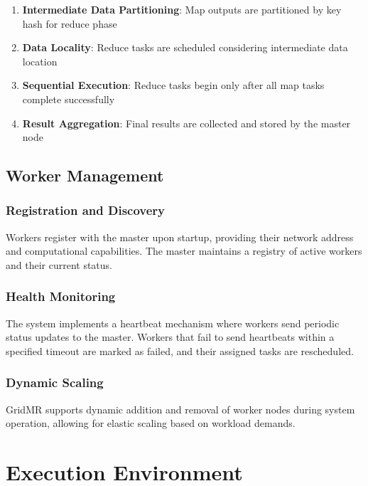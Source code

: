 \documentclass[11pt,letterpaper,oneside]{article}
\begin{document}
\begin{enumerate}
    \item \textbf{Intermediate Data Partitioning}: Map outputs are partitioned by key hash for reduce phase
    \item \textbf{Data Locality}: Reduce tasks are scheduled considering intermediate data location
    \item \textbf{Sequential Execution}: Reduce tasks begin only after all map tasks complete successfully
    \item \textbf{Result Aggregation}: Final results are collected and stored by the master node
\end{enumerate}

\subsection{Worker Management}

\subsubsection{Registration and Discovery}

Workers register with the master upon startup, providing their network address and computational capabilities. The master maintains a registry of active workers and their current status.

\subsubsection{Health Monitoring}

The system implements a heartbeat mechanism where workers send periodic status updates to the master. Workers that fail to send heartbeats within a specified timeout are marked as failed, and their assigned tasks are rescheduled.

\subsubsection{Dynamic Scaling}

GridMR supports dynamic addition and removal of worker nodes during system operation, allowing for elastic scaling based on workload demands.


\section{Execution Environment}
\end{document}
